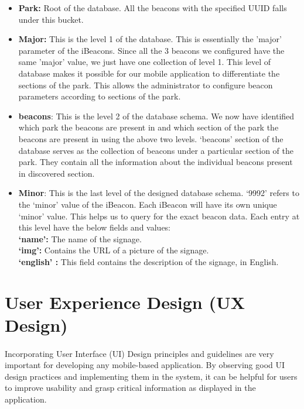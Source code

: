 \documentclass[12pt]{article}
\begin{document}
\begin{itemize}
  \item \textbf{Park:} Root of the database. All the beacons with the specified UUID falls under this bucket. 
  
  \item \textbf{Major:} This is the level 1 of the database. This is essentially the 'major' parameter of the iBeacons. Since all the 3 beacons we configured have the same 'major' value, we just have one collection of level 1. This level of database makes it possible for our mobile application to differentiate the sections of the park. This allows the administrator to configure beacon parameters according to sections of the park.
  
  \item \textbf{beacons}: This is the level 2 of the database schema. We now have identified which park the beacons are present in and which section of the park the beacons are present in using the above two levels. `beacons' section of the database serves as the collection of beacons under a particular section of the park. They contain all the information about the individual beacons present in discovered section.
  
    \item \textbf{Minor}: This is the last level of the designed database schema. `9992' refers to the `minor' value of the iBeacon. Each iBeacon will have its own unique `minor' value. This helps us to query for the exact beacon data. Each entry at this level have the below fields and values: \\
    
    \textbf{`name':} The name of the signage. \\
    \textbf{`img':} Contains the URL of a picture of the signage. \\
    \textbf{`english' :} This field contains the description of the signage, in English.\\
  
\end{itemize}



\section{User Experience Design (UX Design)}
\label{ux}
\paragraph{} Incorporating User Interface (UI) Design principles and guidelines are very important for developing any mobile-based application. By observing good UI design practices and implementing them in the system, it can be helpful for users to improve usability and grasp critical information as displayed in the application. 
\end{document}
